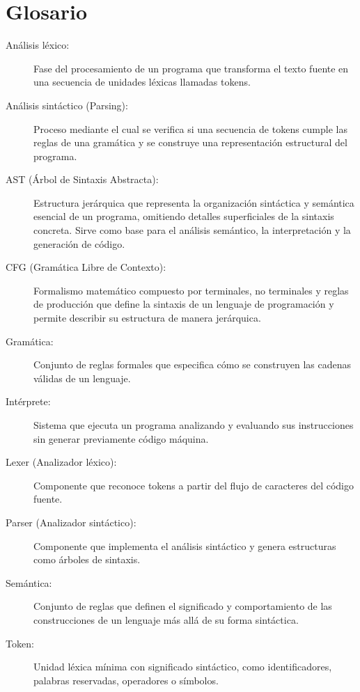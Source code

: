 \chapter*{Glosario}

\begin{description}

\item[Análisis léxico:]
Fase del procesamiento de un programa que transforma el texto fuente en una secuencia de unidades léxicas llamadas tokens.

\item[Análisis sintáctico (Parsing):]
Proceso mediante el cual se verifica si una secuencia de tokens cumple las reglas de una gramática y se construye una representación estructural del programa.

\item[AST (Árbol de Sintaxis Abstracta):]
Estructura jerárquica que representa la organización sintáctica y semántica esencial de un programa, omitiendo detalles superficiales de la sintaxis concreta. Sirve como base para el análisis semántico, la interpretación y la generación de código.

\item[CFG (Gramática Libre de Contexto):]
Formalismo matemático compuesto por terminales, no terminales y reglas de producción que define la sintaxis de un lenguaje de programación y permite describir su estructura de manera jerárquica.

\item[Gramática:]
Conjunto de reglas formales que especifica cómo se construyen las cadenas válidas de un lenguaje.

\item[Intérprete:]
Sistema que ejecuta un programa analizando y evaluando sus instrucciones sin generar previamente código máquina.

\item[Lexer (Analizador léxico):]
Componente que reconoce tokens a partir del flujo de caracteres del código fuente.

\item[Parser (Analizador sintáctico):]
Componente que implementa el análisis sintáctico y genera estructuras como árboles de sintaxis.

\item[Semántica:]
Conjunto de reglas que definen el significado y comportamiento de las construcciones de un lenguaje más allá de su forma sintáctica.

\item[Token:]
Unidad léxica mínima con significado sintáctico, como identificadores, palabras reservadas, operadores o símbolos.

\end{description}
